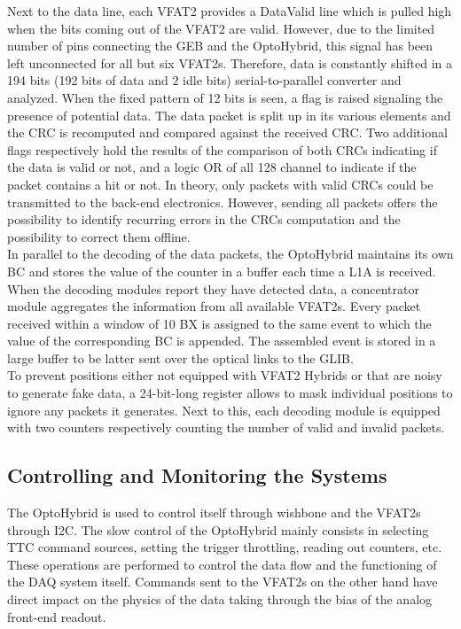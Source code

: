       Next to the data line, each VFAT2 provides a DataValid line which is pulled high when the bits coming out of the VFAT2 are valid. However, due to the limited number of pins connecting the GEB and the OptoHybrid, this signal has been left unconnected for all but six VFAT2s. Therefore, data is constantly shifted in a 194 bits (192 bits of data and 2 idle bits) serial-to-parallel converter and analyzed. When the fixed pattern of 12 bits is seen, a flag is raised signaling the presence of potential data. The data packet is split up in its various elements and the CRC is recomputed and compared against the received CRC. Two additional flags respectively hold the results of the comparison of both CRCs indicating if the data is valid or not, and a logic OR of all 128 channel to indicate if the packet contains a hit or not. In theory, only packets with valid CRCs could be transmitted to the back-end electronics. However, sending all packets offers the possibility to identify recurring errors in the CRCs computation and the possibility to correct them offline. \\

      In parallel to the decoding of the data packets, the OptoHybrid maintains its own BC and stores the value of the counter in a buffer each time a L1A is received. When the decoding modules report they have detected data, a concentrator module aggregates the information from all available VFAT2s. Every packet received within a window of 10 BX is assigned to the same event to which the value of the corresponding BC is appended. The assembled event is stored in a large buffer to be latter sent over the optical links to the GLIB. \\

      To prevent positions either not equipped with VFAT2 Hybrids or that are noisy to generate fake data, a 24-bit-long register allows to mask individual positions to ignore any packets it generates. Next to this, each decoding module is equipped with two counters respectively counting the number of valid and invalid packets.

    \subsection{Controlling and Monitoring the Systems}

      The OptoHybrid is used to control itself through wishbone and the VFAT2s through I2C. The slow control of the OptoHybrid mainly consists in selecting TTC command sources, setting the trigger throttling, reading out counters, etc. These operations are performed to control the data flow and the functioning of the DAQ system itself. Commands sent to the VFAT2s on the other hand have direct impact on the physics of the data taking through the bias of the analog front-end readout. \\

